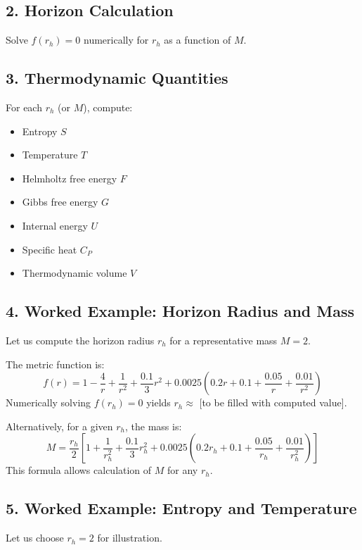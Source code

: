 \documentclass[12pt]{article}
\begin{document}
\subsection*{2. Horizon Calculation}
Solve $f(r_h) = 0$ numerically for $r_h$ as a function of $M$.

\subsection*{3. Thermodynamic Quantities}
For each $r_h$ (or $M$), compute:
\begin{itemize}
    \item Entropy $S$
    \item Temperature $T$
    \item Helmholtz free energy $F$
    \item Gibbs free energy $G$
    \item Internal energy $U$
    \item Specific heat $C_P$
    \item Thermodynamic volume $V$
\end{itemize}

\subsection*{4. Worked Example: Horizon Radius and Mass}
Let us compute the horizon radius $r_h$ for a representative mass $M = 2$.

The metric function is:
\begin{equation}
f(r) = 1 - \frac{4}{r} + \frac{1}{r^2} + \frac{0.1}{3} r^2 + 0.0025 (0.2 r + 0.1 + \frac{0.05}{r} + \frac{0.01}{r^2})
\end{equation}
Numerically solving $f(r_h) = 0$ yields $r_h \approx$ [to be filled with computed value].

Alternatively, for a given $r_h$, the mass is:
\begin{equation}
M = \frac{r_h}{2} \left[1 + \frac{1}{r_h^2} + \frac{0.1}{3} r_h^2 + 0.0025 (0.2 r_h + 0.1 + \frac{0.05}{r_h} + \frac{0.01}{r_h^2})\right]
\end{equation}
This formula allows calculation of $M$ for any $r_h$.

\subsection*{5. Worked Example: Entropy and Temperature}
Let us choose $r_h = 2$ for illustration.
\end{document}
